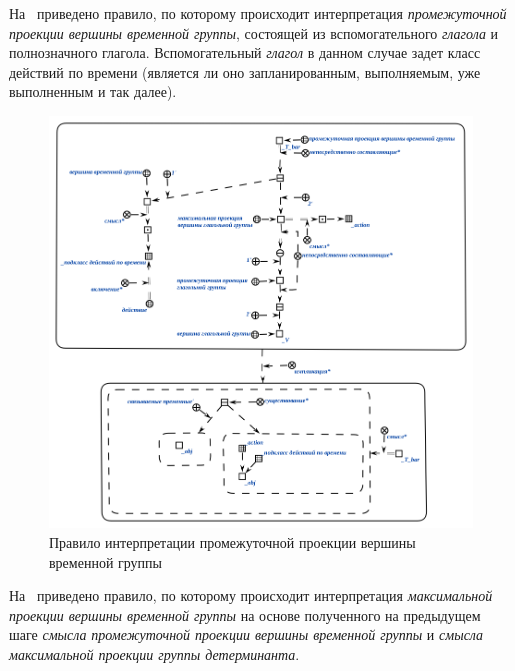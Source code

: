 На~\textit{} приведено правило, по которому происходит интерпретация \textit{промежуточной проекции вершины временной группы}, состоящей из вспомогательного \textit{глагола} и полнозначного глагола.
Вспомогательный \textit{глагол} в данном случае задет класс действий по времени (является ли оно запланированным, выполняемым, уже выполненным и так далее).

\begin{figure}[h]
    \centering
    \includegraphics[scale=0.8]{images/part2/chapter_lang/d_sem_5}
    \caption{Правило интерпретации промежуточной проекции вершины временной группы}
    \label{fig:d_sem_5}
\end{figure}

На~\textit{} приведено правило, по которому происходит интерпретация \textit{максимальной проекции вершины временной группы} на основе полученного на предыдущем шаге \textit{смысла} \textit{промежуточной проекции вершины временной группы} и \textit{смысла} \textit{максимальной проекции группы детерминанта}.

